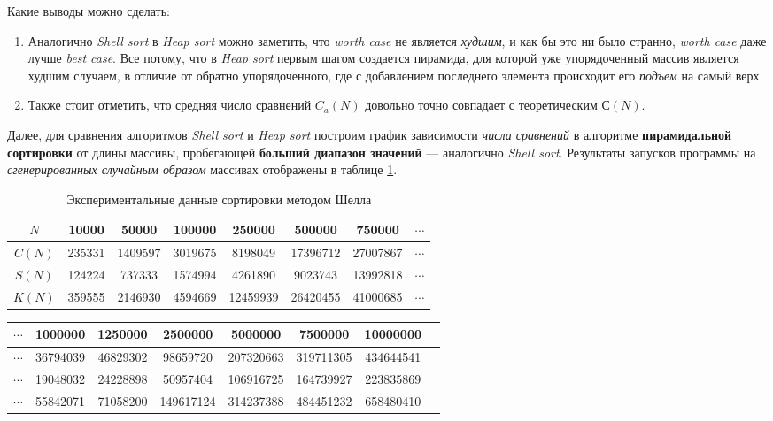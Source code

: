 \documentclass[a4paper,12pt,titlepage,finall]{article}
\begin{document}
Какие выводы можно сделать:
\begin{enumerate}
\item
Аналогично \textit{Shell sort} в \textit{Heap sort} можно заметить, что \textit{worth case} не является \textit{худшим}, и как бы это ни было странно, \textit{worth case} даже лучше \textit{best case}. Все потому, что в \textit{Heap sort} первым шагом создается пирамида, для которой уже упорядоченный массив является худшим случаем, в отличие от обратно упорядоченного, где с добавлением последнего элемента происходит его \textit{подъем} на самый верх.

\item
Также стоит отметить, что средняя число сравнений $C_a(N)$ довольно точно совпадает с теоретическим $С(N)$.
\end{enumerate}

Далее, для сравнения алгоритмов \textit{Shell sort} и \textit{Heap sort} построим график зависимости \textit{числа сравнений} в алгоритме \textbf{пирамидальной сортировки} от длины массивы, пробегающей \textbf{больший диапазон значений} — аналогично \textit{Shell sort}. Результаты запусков программы на \textit{сгенерированных случайным образом} массивах отображены в таблице \ref{heap_table_approximation}.\\

\begin{table}[h]
\centering
\caption{Экспериментальные данные сортировки методом Шелла}
\begin{tabular}{|c|c|c|c|c|c|c|c|}
    \hline
     $N$ & 10000 & 50000 & 100000 & 250000 & 500000 & 750000 & $\cdots$ \\
    \hline
     $C(N)$ & 235331 & 1409597 & 3019675  & 8198049 & 17396712 & 27007867 & $\cdots$ \\
    \hline
    $S(N)$ & 124224 & 737333 & 1574994  & 4261890 & 9023743 & 13992818 & $\cdots$ \\
    \hline
    $K(N)$ & 359555 & 2146930 & 4594669  & 12459939 & 26420455 & 41000685 & $\cdots$ \\
    \hline
\end{tabular}
\label{heap_table_approximation}
\end{table}

\begin{table}[h]
\begin{tabular}{|c|c|c|c|c|c|c|c|}
    \hline
    $\cdots$ & 1000000 & 1250000 & 2500000 & 5000000 & 7500000 & 10000000\\
    \hline
     $\cdots$ & 36794039 & 46829302 & 98659720  & 207320663 & 319711305 & 434644541 \\
    \hline
    $\cdots$ & 19048032 & 24228898 & 50957404  & 106916725 & 164739927 & 223835869 \\
    \hline
    $\cdots$ & 55842071 & 71058200 & 149617124  & 314237388 & 484451232 & 658480410 \\
    \hline
\end{tabular}
\end{table}
\end{document}
